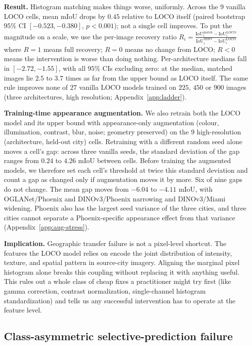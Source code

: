 \textbf{Result.} Histogram matching makes things worse, uniformly. Across the $9$ vanilla LOCO cells, mean mIoU drops by $0.45$ relative to LOCO itself (paired bootstrap $95\%$ CI $[-0.523, -0.380]$, $p < 0.001$); not a single cell improves. To put the magnitude on a scale, we use the per-image recovery ratio $R_i = \frac{\text{IoU}_i^{\text{match}} - \text{IoU}_i^{\text{LOCO}}}{\text{IoU}_i^{\text{upper}} - \text{IoU}_i^{\text{LOCO}}}$ where $R = 1$ means full recovery; $R = 0$ means no change from LOCO; $R < 0$ means the intervention is worse than doing nothing. Per-architecture medians fall in $[-2.72, -1.55]$, with all $95\%$ CIs excluding zero: at the median, matched images lie $2.5$ to $3.7$ times as far from the upper bound as LOCO itself. The same rule improves none of $27$ vanilla LOCO models trained on $225$, $450$ or $900$ images (three architectures, high resolution; Appendix~\ref{app:ladder}).

\textbf{Training-time appearance augmentation.} We also retrain both the LOCO model and its upper bound with appearance-only augmentation (colour, illumination, contrast, blur, noise; geometry preserved) on the $9$ high-resolution (architecture, held-out city) cells. Retraining with a different random seed alone moves a cell's gap: across three vanilla seeds, the standard deviation of the gap ranges from $0.24$ to $4.26$ mIoU between cells. Before training the augmented models, we therefore set each cell's threshold at twice this standard deviation and count a gap as changed only if augmentation moves it by more. Six of nine gaps do not change. The mean gap moves from $-6.04$ to $-4.11$ mIoU, with OGLANet/Phoenix and DINOv3/Phoenix narrowing and DINOv3/Miami widening. Phoenix also has the largest seed variance of the three cities, and three cities cannot separate a Phoenix-specific appearance effect from that variance (Appendix~\ref{app:aug-stress}).

\textbf{Implication.} Geographic transfer failure is not a pixel-level shortcut. The features the LOCO model relies on encode the joint distribution of intensity, texture, and spatial pattern in source-city imagery. Aligning the marginal pixel histogram alone breaks this coupling without replacing it with anything useful. This rules out a whole class of cheap fixes a practitioner might try first (like gamma correction, contrast normalization, single-channel histogram standardization) and tells us any successful intervention has to operate at the feature level. 

\subsection{Class-asymmetric selective-prediction failure}
\label{sec:sp-gap}

